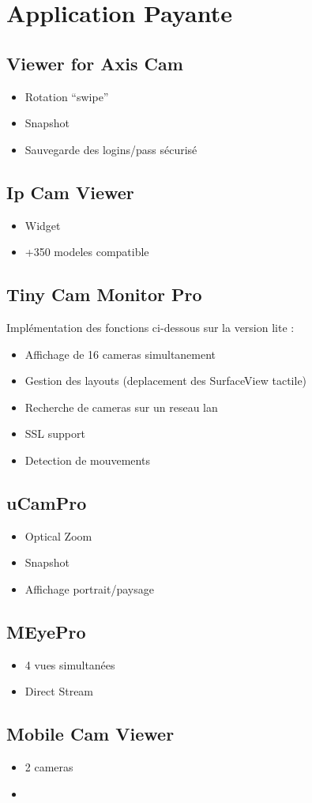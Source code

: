 \documentclass[a4paper,10pt]{report}
\begin{document}
 \chapter[Application Payante]{Application Payante}
\section{Viewer for Axis Cam}
 \begin{itemize}
     \item Rotation ``swipe''
     \item Snapshot	
     \item Sauvegarde des logins/pass sécurisé
 \end{itemize}

\section{Ip Cam Viewer}
 \begin{itemize}
     \item Widget
     \item +350 modeles compatible
 \end{itemize}
 
 \section{Tiny Cam Monitor Pro}
 Implémentation des fonctions ci-dessous sur la version lite : 
 \begin{itemize}
     \item Affichage de 16 cameras simultanement
     \item Gestion des layouts (deplacement des SurfaceView tactile)
     \item Recherche de cameras sur un reseau lan
     \item SSL support
     \item Detection de mouvements
 \end{itemize}
 
 \section{uCamPro}
 \begin{itemize}
     \item Optical Zoom
     \item Snapshot
     \item Affichage portrait/paysage
 \end{itemize}
 
\section{MEyePro}
 \begin{itemize}
     \item 4 vues simultanées
     \item Direct Stream
 \end{itemize}
 
 
 \section{Mobile Cam Viewer}
 \begin{itemize}
     \item 2 cameras
     \item 
 \end{itemize}
 
\end{document}
